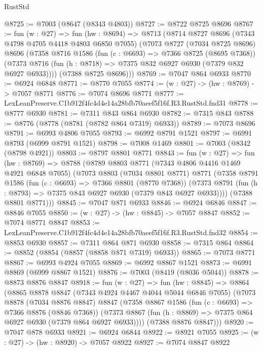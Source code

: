 \begin{lexlean}{RustStd}
\begin{coremodule}
@8725 := @7003 (@8647 (@8343 @4803))
@8727 := @8722 @8725 @8696
@8767 := fun (w : @27) =>
  fun (hw : @8694) =>
  @8713
    (@8714
      @8727
      @8696
      (@7343 @4798 @4705 @4418 @4803 @6850 @7055)
      (@7073
        @8727
        (@7034 @8725 @8696)
        @8696
        (@7358
          @8716
          @1586
          (fun (c : @6693) => @7366 @8725 (@8695 @7368))
          (@7373 @8716 (fun (h : @8718) => @7375 @832 @6927 @6930 (@7379 @832 @6927 @6933))))
        (@7388 @8725 @8696)))
@8769 := @7047 @864 @6933
@8770 := @6924 @6848
@8771 := @8770 @7055
@8774 := (w : @27) -> (hw : @8769) -> @7057 @8771
@8776 := @7074 @8696 @8771
@8777 := LexLeanPreserve.C1b912f4fc4d4e14a28bfb70aeef5f16f.R3.RustStd.fnd31
@8778 := @8777 @6930
@8781 := @7311 @843 @864 @6930
@8782 := @7315 @843
@8788 := @8776 (@8778 (@8781 (@8782 @864 @7319) @6933))
@8789 := @7073 @8696
@8791 := @6993 @4806 @7055
@8793 := @6992 @8791 @1521
@8797 := @6991 @8793 (@6999 @8791 @1521)
@8798 := @7008 @1469
@8801 := @7003 (@8342 (@8798 @4921))
@8803 := @8797 @8801 @8771
@8843 := fun (w : @27) =>
  fun (hw : @8769) =>
  @8788
    (@8789
      @8803
      @8771
      (@7343 @4806 @4416 @1469 @4921 @6848 @7055)
      (@7073
        @8803
        (@7034 @8801 @8771)
        @8771
        (@7358
          @8791
          @1586
          (fun (c : @6693) => @7366 @8801 (@8770 @7368))
          (@7373 @8791 (fun (h : @8793) => @7375 @843 @6927 @6930 (@7379 @843 @6927 @6933))))
        (@7388 @8801 @8771)))
@8845 := @7047 @871 @6933
@8846 := @6924 @6846
@8847 := @8846 @7055
@8850 := (w : @27) -> (hw : @8845) -> @7057 @8847
@8852 := @7074 @8771 @8847
@8853 := LexLeanPreserve.C1b912f4fc4d4e14a28bfb70aeef5f16f.R3.RustStd.fnd32
@8854 := @8853 @6930
@8857 := @7311 @864 @871 @6930
@8858 := @7315 @864
@8864 := @8852 (@8854 (@8857 (@8858 @871 @7319) @6933))
@8865 := @7073 @8771
@8867 := @6993 @4924 @7055
@8869 := @6992 @8867 @1521
@8873 := @6991 @8869 (@6999 @8867 @1521)
@8876 := @7003 (@8419 (@8036 @5044))
@8878 := @8873 @8876 @8847
@8918 := fun (w : @27) =>
  fun (hw : @8845) =>
  @8864
    (@8865
      @8878
      @8847
      (@7343 @4924 @4467 @4044 @5044 @6846 @7055)
      (@7073
        @8878
        (@7034 @8876 @8847)
        @8847
        (@7358
          @8867
          @1586
          (fun (c : @6693) => @7366 @8876 (@8846 @7368))
          (@7373 @8867 (fun (h : @8869) => @7375 @864 @6927 @6930 (@7379 @864 @6927 @6933))))
        (@7388 @8876 @8847)))
@8920 := @7047 @878 @6933
@8921 := @6924 @6844
@8922 := @8921 @7055
@8925 := (w : @27) -> (hw : @8920) -> @7057 @8922
@8927 := @7074 @8847 @8922

\end{coremodule}
\end{lexlean}
